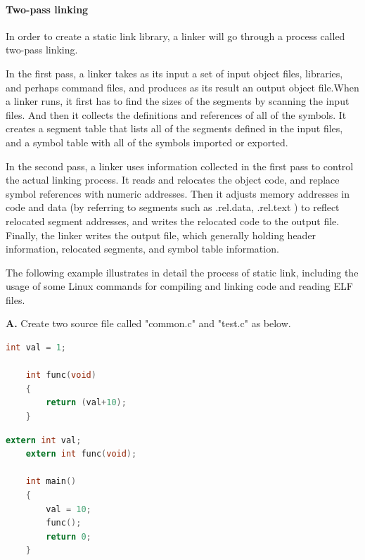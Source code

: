        \paragraph{Two-pass linking}
       In order to create a static link library, a linker will go through a process called two-pass linking.
       
       In the first pass, a linker takes as its input a set of input object files, libraries, and perhaps command files, and produces as its result an output object file\cite{LAL-00}.When a linker runs, it first has to find the sizes of the segments by scanning the input files. And then it collects the definitions and references of all of the symbols. It creates a segment table that lists all of the segments defined in the input files, and a symbol table with all of the symbols imported or exported\cite{LAL-00}.
       
        In the second pass, a linker uses information collected in the first pass to control the actual linking process\cite{LAL-00}. It reads and relocates the object code, and replace symbol references with numeric addresses. Then it adjusts memory addresses in code and data (by referring to segments such as .rel.data, .rel.text ) to reflect relocated segment addresses, and writes the relocated code to the output file\cite{LAL-00}. Finally, the linker writes the output file, which generally holding header information, relocated segments, and symbol table information\cite{LAL-00}.
      
       
       The following example illustrates in detail the process of static link, including the usage of some Linux commands for compiling and linking code and reading ELF files.\newline
       
       \textbf{A.} Create two source file called "common.c" and "test.c" as below.
       
       
            \begin{lstlisting}[language=c, caption= common.c]
    int val = 1; 
    
    int func(void) 
    { 
        return (val+10); 
    } 
            \end{lstlisting}
                
       
            \begin{lstlisting}[language=c, caption= test.c]  
    extern int val; 
    extern int func(void); 
    
    int main() 
    { 
        val = 10; 
        func(); 
        return 0; 
    }                
            \end{lstlisting}  
            
